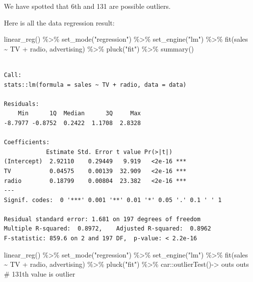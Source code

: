 \documentclass[
  letterpaper,
  DIV=11,
  numbers=noendperiod]{scrreprt}
\newenvironment{Shaded}{\begin{snugshade}}{\end{snugshade}}
\newcommand{\CommentTok}[1]{\textcolor[rgb]{0.41,0.41,0.41}{#1}}
\newcommand{\FunctionTok}[1]{\textcolor[rgb]{0.02,0.16,0.49}{#1}}
\newcommand{\NormalTok}[1]{\textcolor[rgb]{0.33,0.33,0.33}{#1}}
\newcommand{\OtherTok}[1]{\textcolor[rgb]{0.85,0.12,0.09}{#1}}
\newcommand{\SpecialCharTok}[1]{\textcolor[rgb]{0.00,0.46,0.62}{#1}}
\newcommand{\StringTok}[1]{\textcolor[rgb]{0.00,0.50,0.00}{#1}}
\begin{document}
We have spotted that 6th and 131 are possible outliers.

Here is all the data regression result:

\begin{Shaded}
\begin{Highlighting}[]
\FunctionTok{linear\_reg}\NormalTok{() }\SpecialCharTok{\%\textgreater{}\%} 
  \FunctionTok{set\_mode}\NormalTok{(}\StringTok{"regression"}\NormalTok{) }\SpecialCharTok{\%\textgreater{}\%} 
  \FunctionTok{set\_engine}\NormalTok{(}\StringTok{"lm"}\NormalTok{) }\SpecialCharTok{\%\textgreater{}\%} 
  \FunctionTok{fit}\NormalTok{(sales }\SpecialCharTok{\textasciitilde{}}\NormalTok{ TV }\SpecialCharTok{+}\NormalTok{ radio, advertising) }\SpecialCharTok{\%\textgreater{}\%} 
  \FunctionTok{pluck}\NormalTok{(}\StringTok{"fit"}\NormalTok{) }\SpecialCharTok{\%\textgreater{}\%} 
  \FunctionTok{summary}\NormalTok{()}
\end{Highlighting}
\end{Shaded}

\begin{verbatim}

Call:
stats::lm(formula = sales ~ TV + radio, data = data)

Residuals:
    Min      1Q  Median      3Q     Max 
-8.7977 -0.8752  0.2422  1.1708  2.8328 

Coefficients:
            Estimate Std. Error t value Pr(>|t|)    
(Intercept)  2.92110    0.29449   9.919   <2e-16 ***
TV           0.04575    0.00139  32.909   <2e-16 ***
radio        0.18799    0.00804  23.382   <2e-16 ***
---
Signif. codes:  0 '***' 0.001 '**' 0.01 '*' 0.05 '.' 0.1 ' ' 1

Residual standard error: 1.681 on 197 degrees of freedom
Multiple R-squared:  0.8972,    Adjusted R-squared:  0.8962 
F-statistic: 859.6 on 2 and 197 DF,  p-value: < 2.2e-16
\end{verbatim}

\begin{Shaded}
\begin{Highlighting}[]
\FunctionTok{linear\_reg}\NormalTok{() }\SpecialCharTok{\%\textgreater{}\%} 
  \FunctionTok{set\_mode}\NormalTok{(}\StringTok{"regression"}\NormalTok{) }\SpecialCharTok{\%\textgreater{}\%} 
  \FunctionTok{set\_engine}\NormalTok{(}\StringTok{"lm"}\NormalTok{) }\SpecialCharTok{\%\textgreater{}\%} 
  \FunctionTok{fit}\NormalTok{(sales }\SpecialCharTok{\textasciitilde{}}\NormalTok{ TV }\SpecialCharTok{+}\NormalTok{ radio, advertising) }\SpecialCharTok{\%\textgreater{}\%} 
  \FunctionTok{pluck}\NormalTok{(}\StringTok{"fit"}\NormalTok{) }\SpecialCharTok{\%\textgreater{}\%} 
\NormalTok{  car}\SpecialCharTok{::}\FunctionTok{outlierTest}\NormalTok{()}\OtherTok{{-}\textgreater{}}\NormalTok{ outs}
\NormalTok{outs }\CommentTok{\# 131th value is outlier}
\end{Highlighting}
\end{Shaded}
\end{document}
